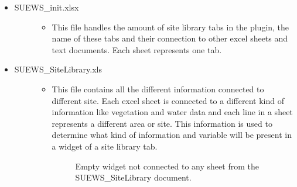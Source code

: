 \documentclass[letterpaper,10pt,english]{sphinxmanual}
\begin{document}
\begin{itemize}
\begin{description}
\begin{itemize}
\end{itemize}

\end{description}

\item {} \begin{description}
\item[{SUEWS\_init.xlsx}] \leavevmode\begin{itemize}
\item {} 
This file handles the amount of site library tabs in the plugin, the name of these tabs and their connection to other excel sheets and text documents. Each sheet represents one tab.

\end{itemize}

\end{description}

\item {} \begin{description}
\item[{SUEWS\_SiteLibrary.xls}] \leavevmode\begin{itemize}
\item {} 
This file contains all the different information connected to different site. Each excel sheet is connected to a different kind of information like vegetation and water data and each line in a sheet represents a different area or site. This information is used to determine what kind of information and variable will be present in a widget of a site library tab.

\begin{figure}[htbp]
\centering
\capstart

\noindent{}
\caption{Empty widget not connected to any sheet from the SUEWS\_SiteLibrary document.}\label{\detokenize{DevelopmentGuidelines:id4}}\end{figure}

\end{itemize}

\end{description}

\end{itemize}
\end{document}
